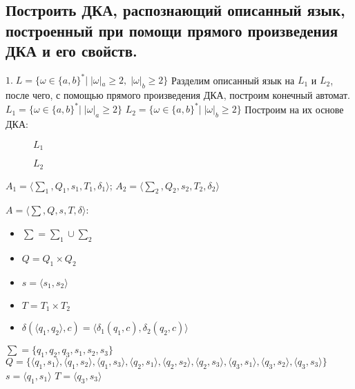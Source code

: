 \documentclass[a4paper,12pt]{article}
\begin{document}
\subsection*{Построить ДКА, распознающий описанный язык, построенный при помощи прямого произведения ДКА и его свойств.}
\Large $1.\;L = {\{\omega \in \{a,b\}^*|\;|\omega|_a \ge 2,\;|\omega|_b \ge 2\}}$\newline
Разделим описанный язык на $L_1$ и $L_2$, после чего, с помощью прямого произведения ДКА, построим конечный автомат.\newline
\Large $L_1 = {\{\omega \in \{a,b\}^*|\;|\omega|_a \ge 2\}}$\newline
\Large $L_2 = {\{\omega \in \{a,b\}^*|\;|\omega|_b \ge 2\}}$\newline
Построим на их основе ДКА:\newline
\begin{figure}[h]
\centering
{}
\caption{$L_1$}
\end{figure}
\begin{figure}[h]
\centering
{}
\caption{$L_2$}
\end{figure}\newline
\begingroup
\raggedleft 
$A_1 = {\langle\sum_1 , Q_1, s_1, T_1, \delta_1 \rangle}$;
$A_2 = {\langle\sum_2 , Q_2, s_2, T_2, \delta_2 \rangle}$\newline
\endgroup
\begingroup
\raggedright 
$A = {\langle\sum , Q, s, T, \delta \rangle}$:
\begin{itemize}
\item $\sum = \sum_1 \cup \sum_2$
\item $Q = Q_1 \times Q_2$
\item $s = \langle s_1 , s_2\rangle$
\item $T = T_1 \times T_2$
\item $\delta(\langle q_1 , q_2\rangle, c) =  \langle \delta_1 (q_1 , c), \delta_2 (q_2, c) \rangle$
\end{itemize}
$\sum = \{q_1, q_2, q_3, s_1, s_2, s_3\}$\newline
\normalsize $Q = \{\langle q_1 , s_1 \rangle ,\langle q_1 , s_2 \rangle ,\langle q_1 , s_3 \rangle , \langle q_2 , s_1 \rangle , \langle q_2 , s_2 \rangle , \langle q_2 , s_3 \rangle , \langle q_3 , s_1 \rangle , \langle q_3 , s_2 \rangle , \langle q_3 , s_3 \rangle \}$\newline
\Large $s = \langle q_1 , s_1 \rangle$\newline
$T = \langle q_3 , s_3 \rangle$\newline
\end{document}
